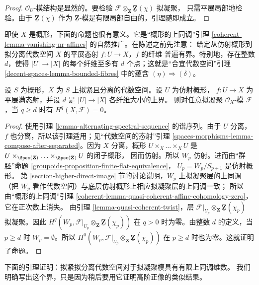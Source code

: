 \begin{proof}
$\mathcal{O}_U$-模结构是显然的。要检验
$\mathcal{F} \otimes_{\mathbf{Z}} \underline{\mathbf{Z}}(\chi)$ 拟凝聚，
只需平展局部地检验。由于 $\underline{\mathbf{Z}}(\chi)$ 作为
$\underline{\mathbf{Z}}$-模是有限局部自由的，引理随即成立。
\end{proof}

\noindent
即使 $X$ 是概形，下面的命题也很有意义。它是“概形的上同调”引理
\ref{coherent-lemma-vanishing-nr-affines} 的自然推广。在陈述之前先注意：
给定从仿射概形到拟分离代数空间 $X$ 的平展态射 $f : U \to X$，$f$ 的纤维
普遍有界。特别地，存在整数 $d$，使得 $|U| \to |X|$ 的每个纤维至多有
$d$ 个点；这就是“合宜代数空间”引理
\ref{decent-spaces-lemma-bounded-fibres} 中的蕴含
$(\eta) \Rightarrow (\delta)$。

\begin{proposition}
\label{proposition-vanishing}
设 $S$ 为概形，$X$ 为 $S$ 上拟紧且分离的代数空间。设 $U$ 为仿射概形，
$f : U \to X$ 为平展满态射，并设 $d$ 是 $|U| \to |X|$ 各纤维大小的上界。
则对任意拟凝聚 $\mathcal{O}_X$-模 $\mathcal{F}$，当 $q \geq d$ 时有
$H^q(X, \mathcal{F}) = 0$。
\end{proposition}

\begin{proof}
使用引理 \ref{lemma-alternating-spectral-sequence} 的谱序列。由于 $U$ 分离，
$f$ 也分离，所以该引理适用；见“代数空间的态射”引理
\ref{spaces-morphisms-lemma-compose-after-separated}。因为 $X$ 分离，概形
$U \times_X \ldots \times_X U$ 是
$U \times_{\Spec(\mathbf{Z})} \ldots \times_{\Spec(\mathbf{Z})} U$ 的闭子概形，
因而仿射。所以 $W_p$ 仿射。进而由“群胚”命题
\ref{groupoids-proposition-finite-flat-equivalence}，
$U_p = W_p/S_{p + 1}$ 是仿射概形。
第 \ref{section-higher-direct-image} 节的讨论说明，$W_p$ 上拟凝聚层的上同调
（把 $W_p$ 看作代数空间）与底层仿射概形上相应拟凝聚层的上同调一致；
所以由“概形的上同调”引理
\ref{coherent-lemma-quasi-coherent-affine-cohomology-zero}，它在正次数上消失。
由引理 \ref{lemma-quasi-coherent-twist}，层
$\mathcal{F}|_{U_p} \otimes_\mathbf{Z} \underline{\mathbf{Z}}(\chi_p)$
拟凝聚。因此
$H^q(W_p,
\mathcal{F}|_{U_p} \otimes_\mathbf{Z} \underline{\mathbf{Z}}(\chi_p))$
在 $q > 0$ 时为零。由整数 $d$ 的定义，当 $p \geq d$ 时
$W_p = \emptyset$。所以
$H^0(W_p,
\mathcal{F}|_{U_p} \otimes_\mathbf{Z} \underline{\mathbf{Z}}(\chi_p))$
在 $p \geq d$ 时也为零。这就证明了命题。
\end{proof}

\noindent
下面的引理证明：拟紧拟分离代数空间对于拟凝聚模具有有限上同调维数。
我们明确写出这个界，只是因为稍后要用它证明高阶正像的类似结果。

